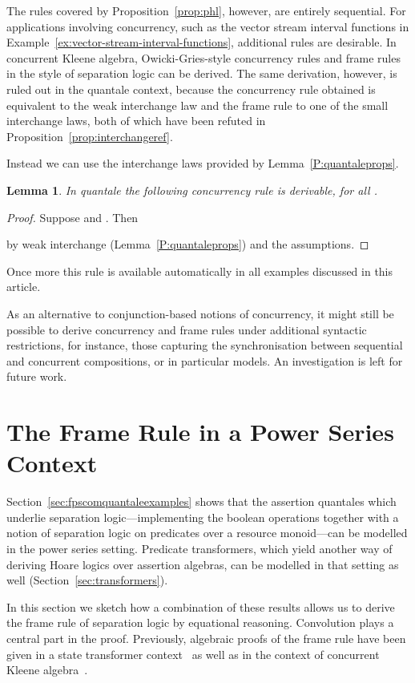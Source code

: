 \documentclass[12pt]{article}
\newtheorem{lemma}{Lemma}
\theoremstyle{definition}
\begin{document}
The rules covered by Proposition~\ref{prop:phl}, however, are entirely
sequential. For applications involving concurrency, such as the vector
stream interval functions in
Example~\ref{ex:vector-stream-interval-functions}, additional rules are
desirable.  In concurrent Kleene algebra, Owicki-Gries-style
concurrency rules and frame rules in the style of separation logic can
be derived. The same derivation, however, is ruled out in the quantale
context, because the concurrency rule obtained is equivalent to the
weak interchange law and the frame rule to one of the small
interchange laws, both of which have been refuted in
Proposition~\ref{prop:interchangeref}.

Instead we can use the interchange laws provided by
Lemma~\ref{P:quantaleprops}.
\begin{lemma}\label{lem:quantale-concrule}
  In quantale  the following concurrency rule is derivable,
  for all   .

\end{lemma}
\begin{proof}
Suppose  and . Then 

by weak interchange (Lemma~\ref{P:quantaleprops}) and the assumptions.
\end{proof}
\noindent Once more this rule is available automatically in all examples
discussed in this article.


As an alternative to conjunction-based notions of concurrency, it
might still be possible to derive concurrency and frame rules under
additional syntactic restrictions, for instance, those capturing the
synchronisation between sequential and concurrent compositions, or in
particular models. An investigation is left for future work.



\section{The Frame Rule in a Power Series Context}\label{sec:frame}

Section~\ref{sec:fpscomquantaleexamples} shows that the assertion
quantales which underlie separation logic---implementing the boolean
operations together with a notion of separation logic on predicates
over a resource monoid---can be modelled in the power series setting.
Predicate transformers, which yield another way of deriving Hoare
logics over assertion algebras, can be modelled in that setting as
well (Section~\ref{sec:transformers}).

In this section we sketch how a combination of these results allows us
to derive the frame rule of separation logic by equational
reasoning. Convolution plays a central part in the proof.  Previously,
algebraic proofs of the frame rule have been given in a state
transformer context~\cite{COY07} as well as in the context of
concurrent Kleene algebra~\cite{HMSW11}.
\end{document}
